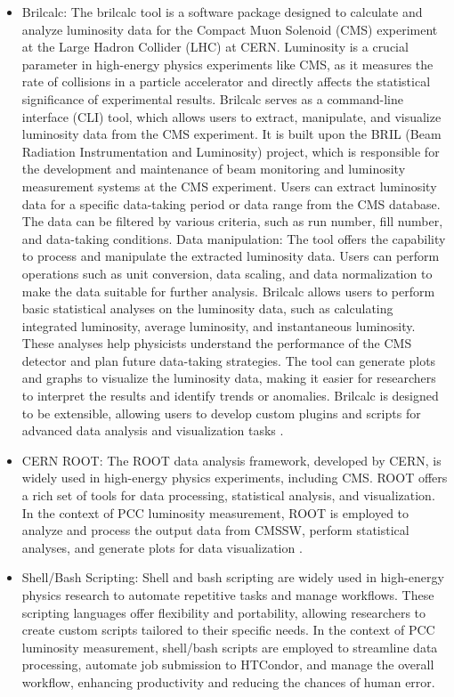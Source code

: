 \begin{itemize}
\item Brilcalc: The brilcalc tool is a software package designed to calculate and analyze luminosity data for the Compact Muon Solenoid (CMS) experiment at the Large Hadron Collider (LHC) at CERN. Luminosity is a crucial parameter in high-energy physics experiments like CMS, as it measures the rate of collisions in a particle accelerator and directly affects the statistical significance of experimental results. Brilcalc serves as a command-line interface (CLI) tool, which allows users to extract, manipulate, and visualize luminosity data from the CMS experiment. It is built upon the BRIL (Beam Radiation Instrumentation and Luminosity) project, which is responsible for the development and maintenance of beam monitoring and luminosity measurement systems at the CMS experiment. Users can extract luminosity data for a specific data-taking period or data range from the CMS database. The data can be filtered by various criteria, such as run number, fill number, and data-taking conditions. Data manipulation: The tool offers the capability to process and manipulate the extracted luminosity data. Users can perform operations such as unit conversion, data scaling, and data normalization to make the data suitable for further analysis. Brilcalc allows users to perform basic statistical analyses on the luminosity data, such as calculating integrated luminosity, average luminosity, and instantaneous luminosity. These analyses help physicists understand the performance of the CMS detector and plan future data-taking strategies. The tool can generate plots and graphs to visualize the luminosity data, making it easier for researchers to interpret the results and identify trends or anomalies. Brilcalc is designed to be extensible, allowing users to develop custom plugins and scripts for advanced data analysis and visualization tasks \cite{CMSLuminosityCalculationGuide}.

\item CERN ROOT: The ROOT data analysis framework, developed by CERN, is widely used in high-energy physics experiments, including CMS. ROOT offers a rich set of tools for data processing, statistical analysis, and visualization. In the context of PCC luminosity measurement, ROOT is employed to analyze and process the output data from CMSSW, perform statistical analyses, and generate plots for data visualization \cite{ROOT}.

\item Shell/Bash Scripting: Shell and bash scripting are widely used in high-energy physics research to automate repetitive tasks and manage workflows. These scripting languages offer flexibility and portability, allowing researchers to create custom scripts tailored to their specific needs. In the context of PCC luminosity measurement, shell/bash scripts are employed to streamline data processing, automate job submission to HTCondor, and manage the overall workflow, enhancing productivity and reducing the chances of human error.


\end{itemize}
